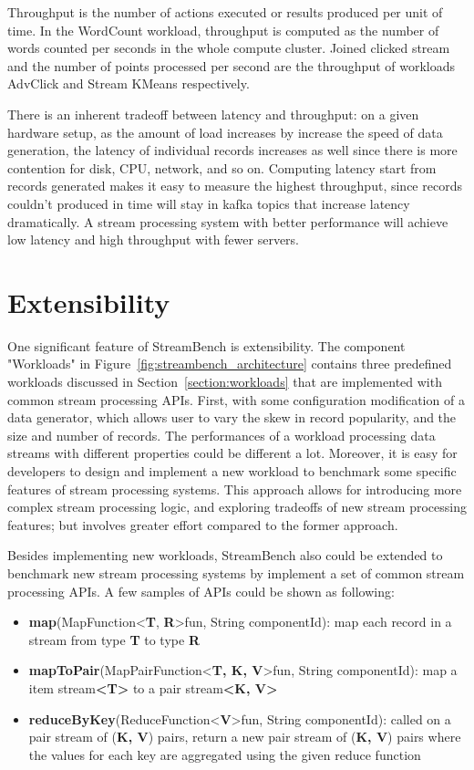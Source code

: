 Throughput is the number of actions executed or results produced per unit of time. In the WordCount workload, throughput is computed as the number of words counted per seconds in the whole compute cluster. Joined clicked stream and the number of points processed per second are the throughput of workloads AdvClick and Stream KMeans respectively.

There is an inherent tradeoff between latency and throughput: on a given hardware setup, as the amount of load increases by increase the speed of data generation, the latency of individual records increases as well since there is more contention for disk, CPU, network, and so on. Computing latency start from records generated makes it easy to measure the highest throughput, since records couldn't produced in time will stay in kafka topics that increase latency dramatically. A stream processing system with better performance will achieve low latency and high throughput with fewer servers.

\section{Extensibility}
\label{section:extensibility}

One significant feature of StreamBench is extensibility. The component "Workloads" in Figure~\ref{fig:streambench_architecture} contains three predefined workloads discussed in Section~\ref{section:workloads} that are implemented with common stream processing APIs. First, with some configuration modification of a data generator, which allows user to vary the skew in record popularity, and the size and number of records. The performances of a workload processing data streams with different properties could be different a lot. Moreover, it is easy for developers to design and implement a new workload to benchmark some specific features of stream processing systems. This approach allows for introducing more complex stream processing logic, and exploring tradeoffs of new stream processing features; but involves greater effort compared to the former approach.

Besides implementing new workloads, StreamBench also could be extended to benchmark new stream processing systems by implement a set of common stream processing APIs. A few samples of APIs could be shown as following:
\begin{itemize}
\item \textbf{map}(MapFunction\textless \textbf{T}, \textbf{R}\textgreater fun, String componentId): map each record in a stream from type \textbf{T} to type \textbf{R}
\item \textbf{mapToPair}(MapPairFunction\textless \textbf{T, K, V}\textgreater fun, String componentId): map a  item stream\textbf{\textless T\textgreater } to a pair stream\textbf{\textless K, V\textgreater}
\item \textbf{reduceByKey}(ReduceFunction\textless \textbf{V}\textgreater fun, String componentId): called on a pair stream of (\textbf{K, V}) pairs, return a new pair stream of (\textbf{K, V}) pairs where the values for each key are aggregated using the given reduce function
\end{itemize}

